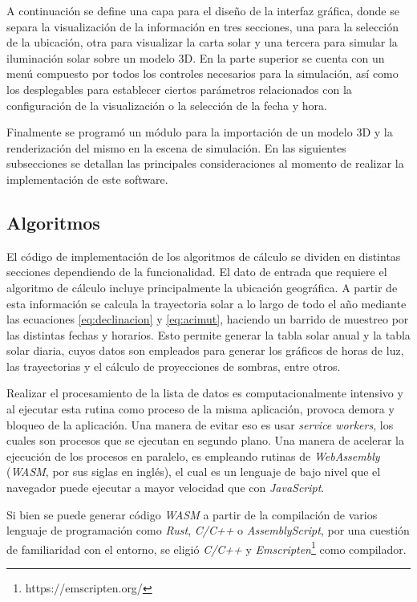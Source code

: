 \documentclass[a4paper]{article}
\begin{document}
A continuación se define una capa para el diseño de la interfaz gráfica, donde se separa la visualización de la información en tres secciones, una para la selección de la ubicación, otra para visualizar la carta solar y una tercera para simular la iluminación solar sobre un modelo 3D. En la parte superior se cuenta con un menú compuesto por todos los controles necesarios para la simulación, así como los desplegables para establecer ciertos parámetros relacionados con la configuración de la visualización o la selección de la fecha y hora.

Finalmente se programó un módulo para la importación de un modelo 3D y la renderización del mismo en la escena de simulación. En las siguientes subsecciones se detallan las principales consideraciones al momento de realizar la implementación de este software.

\subsection{Algoritmos}

El código de implementación de los algoritmos de cálculo se dividen en distintas secciones dependiendo de la funcionalidad. El dato de entrada que requiere el algoritmo de cálculo incluye principalmente la ubicación geográfica. A partir de esta información se calcula la trayectoria solar a lo largo de todo el año mediante las ecuaciones \ref{eq:declinacion} y \ref{eq:acimut}, haciendo un barrido de muestreo por las distintas fechas y horarios. Esto permite generar la tabla solar anual y la tabla solar diaria, cuyos datos son empleados para generar los gráficos de horas de luz, las trayectorias y el cálculo de proyecciones de sombras, entre otros.

Realizar el procesamiento de la lista de datos es computacionalmente intensivo y al ejecutar esta rutina como proceso de la misma aplicación, provoca demora y bloqueo de la aplicación. Una manera de evitar eso es usar \textit{service workers}, los cuales son procesos que se ejecutan en segundo plano. Una manera de acelerar la ejecución de los procesos en paralelo, es empleando rutinas de \textit{WebAssembly} (\textit{WASM}, por sus siglas en inglés), el cual es un lenguaje de bajo nivel que el navegador puede ejecutar a mayor velocidad que con \textit{JavaScript}.

Si bien se puede generar código \textit{WASM} a partir de la compilación de varios lenguaje de programación como \textit{Rust}, \textit{C/C++} o \textit{AssemblyScript}, por una cuestión de familiaridad con el entorno, se eligió \textit{C/C++} y \textit{Emscripten}\footnote{https://emscripten.org/} como compilador.
\end{document}
